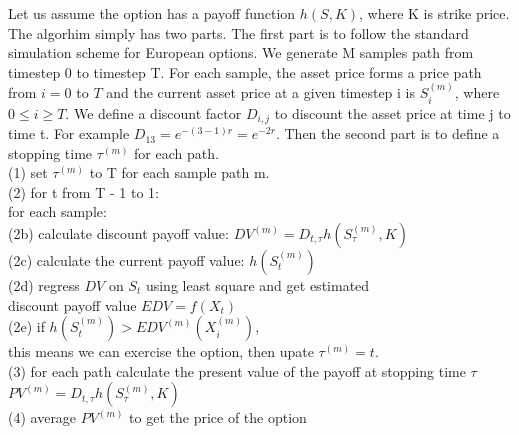 \documentclass[a4paper]{article}
\begin{document}
Let us assume the option has a payoff function $h(S, K)$, where K is strike price.
The algorhim simply has two parts. The first part is to follow the standard simulation scheme for European options. We generate M samples path from timestep 0 to timestep T. For each sample, the asset price forms a price path from $i = 0$ to $T$ and the current asset price at a given timestep i is $S^{(m)}_i$, where $0 \leq i \geq T$. We define a discount factor $D_{i,j}$ to discount the asset price at time j to time t. For example $D_{13} = e^{-(3-1)r} = e^{-2r}$. 
Then the second part is to define a stopping time $\tau^{(m)}$ for each path. \\
(1) set $\tau^{(m)}$ to T for each sample path m.\\
(2) for t from T - 1 to 1:\\
\indent  for each sample:\\
\indent  (2b) calculate discount payoff value: $DV^{(m)} = D_{t, \tau} h(S^{(m)}_\tau, K) $\\
\indent  (2c) calculate the current payoff value: $h(S^{(m)}_t)$\\
\indent	 (2d) regress $DV$ on ${S_t}$ using least square and get estimated \\
\indent      discount payoff value $EDV = f(X_t)$\\
\indent	 (2e) if $h(S^{(m)}_t) > EDV^{(m)}(X^{(m)}_i)$, \\
\indent       this means we can exercise the option, then upate $\tau^{(m)} = t$.\\
(3) for each path calculate the present value of the payoff at stopping time $\tau$ \\
$PV^{(m)} = D_{t, \tau} h(S^{(m)}_\tau, K)$\\
(4) average $PV^{(m)}$ to get the price of the option\\
\end{document}
